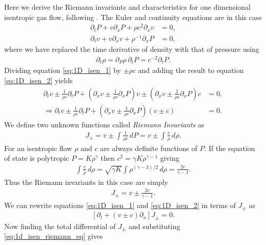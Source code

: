 Here we derive the Riemann invariants and characteristics for one dimensional isentropic gas flow, following \citet{landau1987}.
The Euler and continuity equations are in this case
\begin{align}
    \partial_t P + v \partial_x P + \rho c^2 \partial_x v &= 0, \label{eq:1D_isen_1} \\
    \partial_t v + v \partial_x v + \rho^{-1} \partial_x P &=0, \label{eq:1D_isen_2}
\end{align}
where we have replaced the time derivative of density with that of pressure using
\begin{align}
    \partial_t \rho = \partial_P \rho \, \partial_t P = c^{-2} \partial_t P.
\end{align}
Dividing equation \ref{eq:1D_isen_1} by $\pm \rho c$ and adding the result to equation \ref{eq:1D_isen_2} yields
\begin{align}
    \partial_t v \pm \frac{1}{\rho c} \partial_t P + \left( \partial_x v \pm \frac{1}{\rho c} \partial_x P \right) v \pm \left( \partial_x v \pm \frac{1}{\rho c} \partial_x P \right) c &= 0, \\
    \Rightarrow  \partial_t v \pm \frac{1}{\rho c} \partial_t P + \left( \partial_x v \pm \frac{1}{\rho c} \partial_x P \right) \left( v \pm c \right) &= 0.
\end{align}
We define two unknown functions called \textit{Riemann Invariants} as
\begin{align}
    J_\pm = v \pm \int \frac{1}{\rho c} \, dP = v \pm \int \frac{c}{\rho} \, d\rho.
\end{align}
For an isentropic flow $\rho$ and $c$ are always definite functions of $P$.
If the equation of state is polytropic $P = K \rho^\gamma$ then $c^2 = \gamma K \rho^{\gamma-1}$ giving
\begin{align}
    \int \frac{c}{\rho} \, d\rho = \sqrt{\gamma K} \int \rho^{(\gamma-3)/2} \, d\rho = \frac{2 c}{\gamma -1}.
\end{align}
Thus the Riemann invariants in this case are simply
\begin{align}
    J_\pm = v \pm \frac{2 c}{\gamma -1}.
\end{align}
We can rewrite equations \ref{eq:1D_isen_1} and \ref{eq:1D_isen_2} in terms of $J_\pm$ as
\begin{align}
    \left[ \partial_t + \left( v \pm c \right) \partial_x \right] J_\pm = 0. \label{eq:1d_isen_riemann_eq}
\end{align}
Now finding the total differential of $J_\pm$ and substituting \ref{eq:1d_isen_riemann_eq} gives
